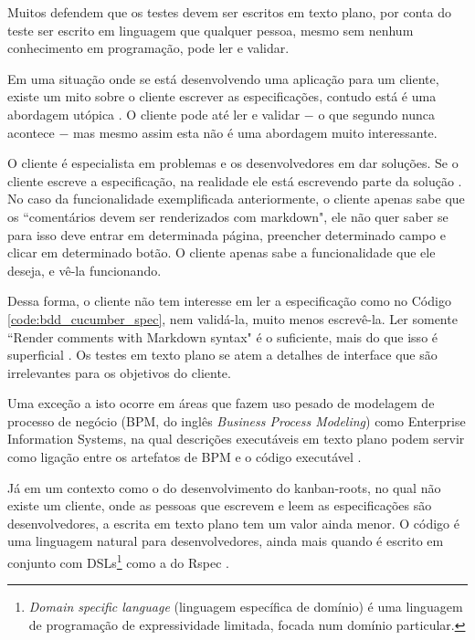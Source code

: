 Muitos defendem que os testes devem ser escritos em texto plano, por conta do teste ser escrito em linguagem que qualquer pessoa, mesmo sem nenhum conhecimento em programação, pode ler e validar.

Em uma situação onde se está desenvolvendo uma aplicação para um cliente, existe um mito sobre o cliente escrever as especificações, contudo está é uma abordagem utópica \cite{SteakOverCucumber, CucumberForVegetarians, ClientsWritingCucumber}. O cliente pode até ler e validar $-$ o que segundo  nunca acontece $-$ mas mesmo assim esta não é uma abordagem muito interessante.

O cliente é especialista em problemas e os desenvolvedores em dar soluções. Se o cliente escreve a especificação, na realidade ele está escrevendo parte da solução \cite{SteakOverCucumber}. No caso da funcionalidade exemplificada anteriormente, o cliente apenas sabe que os ``comentários devem ser renderizados com markdown", ele não quer saber se para isso deve entrar em determinada página, preencher determinado campo e clicar em determinado botão. O cliente apenas sabe a funcionalidade que ele deseja, e vê-la funcionando.

Dessa forma, o cliente não tem interesse em ler a especificação como no Código \ref{code:bdd_cucumber_spec}, nem validá-la, muito menos escrevê-la. Ler somente ``Render comments with Markdown syntax" é o suficiente, mais do que isso é superficial \cite{WhyBotherWithCucumberTesting}. Os testes em texto plano se atem a detalhes de interface que são irrelevantes para os objetivos do cliente.

Uma exceção a isto ocorre em áreas que fazem uso pesado de modelagem de processo de negócio (BPM, do inglês \textit{Business Process Modeling})  como Enterprise Information Systems, na qual descrições executáveis em texto plano podem servir como ligação entre os artefatos de BPM e o código executável \cite{IntroducingBLDD}.

Já em um contexto como o do desenvolvimento do kanban-roots, no qual não existe um cliente, onde as pessoas que escrevem e leem as especificações são desenvolvedores, a escrita em texto plano tem um valor ainda menor. O código é uma linguagem natural para desenvolvedores, ainda mais quando é escrito em conjunto com DSLs\footnote{\textit{Domain specific language} (linguagem específica de domínio) é uma linguagem de programação de expressividade limitada, focada num domínio particular.}  como a do Rspec \cite{SteakOverCucumber}.


